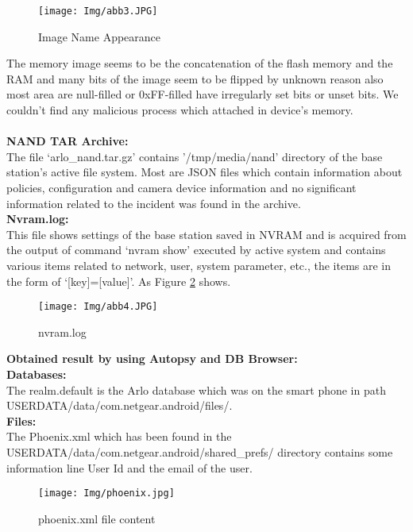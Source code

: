 \documentclass{easychair}
\begin{document}
\begin{figure}[H]
    \centering
    \texttt{[image: Img/abb3.JPG]}
    \caption{Image Name Appearance }
    \label{fig:INA}
\end{figure}

The memory image seems to be the concatenation of the flash memory and the RAM and many bits of the image seem to be flipped by unknown reason also most area are null-filled or 0xFF-filled have irregularly set bits or unset bits.  We couldn’t find any malicious process which attached in device’s memory.\\\\
\textbf{NAND TAR Archive:}\\
The file ‘arlo\_nand.tar.gz’ contains '/tmp/media/nand' directory of the base station’s active file system. Most are JSON files which contain information about policies, configuration and camera device information and no significant information related to the incident was found in the archive.\\
\textbf{Nvram.log:}\\
This file shows settings of the base station saved in NVRAM and is acquired from the output of command ‘nvram show’ executed by active system and contains various items related to network, user, system parameter, etc., the items are in the form of ‘[key]=[value]’. As Figure \ref{fig:nvram.log} shows.

\begin{figure}[H]
    \centering
    \texttt{[image: Img/abb4.JPG]}
    \caption{nvram.log }
    \label{fig:nvram.log}
\end{figure}


\textbf{Obtained result by using Autopsy and DB Browser:}\\

\textbf{Databases:}\\
The realm.default is the Arlo database which was on the smart phone in path USERDATA/data/com.netgear.android/files/.\\

\textbf{Files:}\\
The Phoenix.xml which has been found in the USERDATA/data/com.netgear.android/shared\_prefs/ directory contains some information line User Id and the email of the user.
\begin{figure}[H]
    \centering
    \texttt{[image: Img/phoenix.jpg]}
    \caption{phoenix.xml file content}
    \label{fig:my_label}
\end{figure}
\end{document}
